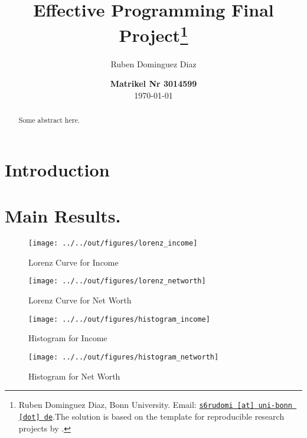 \documentclass[11pt, a4paper, leqno]{article}
\begin{document}
\title{Effective Programming Final Project\thanks{Ruben Dominguez Diaz, Bonn University. Email: \href{mailto:s6rudomi@uni-bonn.de}{\nolinkurl{s6rudomi [at] uni-bonn [dot] de}}.The solution is based on the template for reproducible research projects by \citet{GaudeckerEconProjectTemplates}.}}

\author{Ruben Dominguez Diaz}

\date{
{\bf Matrikel Nr 3014599} 
\\[1ex] 
\today
}

\maketitle

\begin{abstract}
	Some abstract here.
\end{abstract}
\clearpage

\section{Introduction} 
\label{sec:introduction}

\section{Main Results.}

\begin{figure}
    \caption{Lorenz Curve for Income}
    
    \texttt{[image: ../../out/figures/lorenz\_income]}

\end{figure}


\begin{figure}
    \caption{Lorenz Curve for Net Worth}
    
    \texttt{[image: ../../out/figures/lorenz\_networth]}

\end{figure}

\begin{figure}
    \caption{Histogram for Income}
    
    \texttt{[image: ../../out/figures/histogram\_income]}

\end{figure}

\begin{figure}
    \caption{Histogram for Net Worth}
    
    \texttt{[image: ../../out/figures/histogram\_networth]}

\end{figure}
\end{document}
